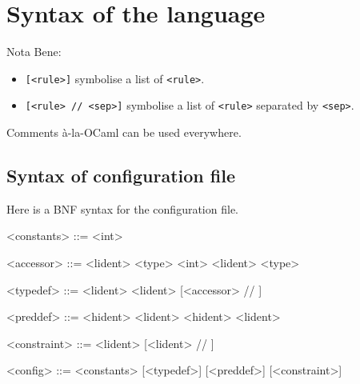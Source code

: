 \documentclass[10pt,a4paper]{article}
\begin{document}
\section{Syntax of the language}
Nota Bene:
\begin{itemize}
\item \verb|[<rule>]| symbolise a list of \verb|<rule>|.
\item \verb|[<rule> // <sep>]| symbolise a list of \verb|<rule>| separated by \verb|<sep>|.
\end{itemize}

Comments à-la-OCaml can be used everywhere.

\subsection{Syntax of configuration file}
\label{subsec:syntaxconfig} Here is a BNF syntax for the configuration file.
\begin{grammar}
  <constants> ::=
    \lit{=} <int>

  <accessor> ::=
  <lident>  <type>
  \alt <int> <lident>  <type>

  <typedef> ::=
   <lident>
  \alt {} <lident> \lit{=} [<accessor> // \lit{|}]

  <preddef> ::=
   <hident>  <lident>
  \alt {} <hident>  <lident>

  <constraint> ::=
   <lident>  [<lident> // \lit{|}]

  <config> ::=
  <constants> [<typedef>] [<preddef>] [<constraint>]
\end{grammar}
\end{document}
